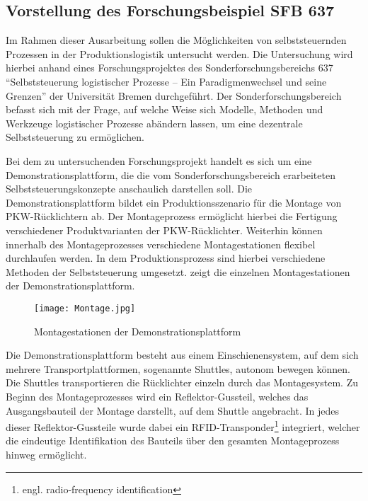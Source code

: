 \subsection{Vorstellung des Forschungsbeispiel SFB 637}
\label{sec:Forschungsbeispiel_SFB}
Im Rahmen dieser Ausarbeitung sollen die Möglichkeiten von selbststeuernden
Prozessen in der Produktionslogistik untersucht werden. Die Untersuchung wird
hierbei anhand eines Forschungsprojektes des Sonderforschungsbereichs 637
"`Selbststeuerung logistischer Prozesse – Ein Paradigmenwechsel und seine
Grenzen"' der Universität Bremen durchgeführt. Der Sonderforschungsbereich
befasst sich mit der Frage, auf welche Weise sich Modelle, Methoden und
Werkzeuge logistischer Prozesse abändern lassen, um eine dezentrale 
Selbststeuerung zu ermöglichen.

Bei dem zu untersuchenden Forschungsprojekt handelt es sich um eine
Demonstrationsplattform, die die vom Sonderforschungsbereich erarbeiteten
Selbststeuerungskonzepte anschaulich darstellen soll. Die
Demonstrationsplattform bildet ein Produktionsszenario für die Montage von
PKW-Rücklichtern ab. Der Montageprozess ermöglicht hierbei die Fertigung
verschiedener Produktvarianten der PKW-Rücklichter. Weiterhin können innerhalb
des Montageprozesses verschiedene Montagestationen flexibel durchlaufen werden.
In dem Produktionsprozess sind hierbei verschiedene Methoden der
Selbststeuerung umgesetzt.  zeigt die einzelnen
Montagestationen der Demonstrationsplattform.

\begin{figure}[htb] 
\centering
\texttt{[image: Montage.jpg]}
\caption[Montagestation]{Montagestationen der Demonstrationsplattform\protect\footnotemark}
\label{fig:Montagestation}
\end{figure}

Die Demonstrationsplattform besteht aus einem Einschienensystem, auf dem sich
mehrere Transportplattformen, sogenannte Shuttles, autonom bewegen können. Die
Shuttles transportieren die Rücklichter einzeln durch das Montagesystem. Zu
Beginn des Montageprozesses wird ein Reflektor-Gussteil, welches das
Ausgangsbauteil der Montage darstellt, auf dem Shuttle angebracht. In jedes
dieser Reflektor-Gussteile wurde dabei ein RFID-Transponder\footnote{engl.
radio-frequency identification} integriert, welcher die eindeutige
Identifikation des Bauteils über den gesamten Montageprozess hinweg ermöglicht.

